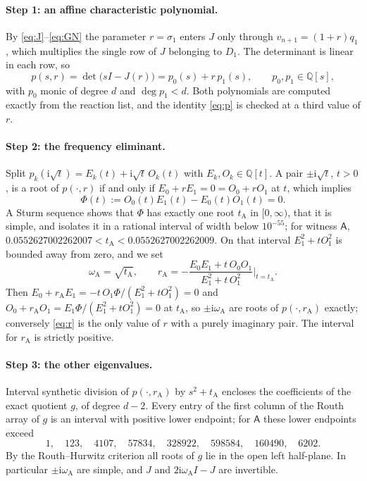 \documentclass[11pt,a4paper]{article}
\theoremstyle{plain}
\theoremstyle{definition}
\theoremstyle{remark}
\newcommand{\ii}{\mathrm i}
\newcommand{\rA}{r_{\mathrm A}}
\newcommand{\omA}{\omega_{\mathrm A}}
\newcommand{\WA}{\mathsf A}
\begin{document}
\paragraph{Step 1: an affine characteristic polynomial.} By \eqref{eq:J}--\eqref{eq:GN} the parameter $r=\sigma_1$ enters $J$ only through $v_{n+1}=(1+r)q_1$, which multiplies the single row of $J$ belonging to $D_1$. The determinant is linear in each row, so
\begin{equation}\label{eq:p}
 p(s,r)=\det\bigl(sI-J(r)\bigr)=p_0(s)+r\,p_1(s),\qquad p_0,p_1\in\mathbb Q[s],
\end{equation}
with $p_0$ monic of degree $d$ and $\deg p_1<d$. Both polynomials are computed exactly from the reaction list, and the identity \eqref{eq:p} is checked at a third value of $r$.

\paragraph{Step 2: the frequency eliminant.} Split $p_k(\ii\sqrt t)=E_k(t)+\ii\sqrt t\,O_k(t)$ with $E_k,O_k\in\mathbb Q[t]$. A pair $\pm\ii\sqrt t$, $t>0$, is a root of $p(\cdot,r)$ if and only if $E_0+rE_1=0=O_0+rO_1$ at $t$, which implies
\begin{equation}\label{eq:Phi}
 \Phi(t):=O_0(t)E_1(t)-E_0(t)O_1(t)=0 .
\end{equation}
A Sturm sequence shows that $\Phi$ has exactly one root $t_{\mathrm A}$ in $[0,\infty)$, that it is simple, and isolates it in a rational interval of width below $10^{-55}$; for witness $\WA$, $0.0552627002262007<t_{\mathrm A}<0.0552627002262009$. On that interval $E_1^2+tO_1^2$ is bounded away from zero, and we set
\begin{equation}\label{eq:r}
 \omA=\sqrt{t_{\mathrm A}},\qquad \rA=-\frac{E_0E_1+t\,O_0O_1}{E_1^2+t\,O_1^2}\Big|_{t=t_{\mathrm A}} .
\end{equation}
Then $E_0+\rA E_1=-t\,O_1\Phi/(E_1^2+tO_1^2)=0$ and $O_0+\rA O_1=E_1\Phi/(E_1^2+tO_1^2)=0$ at $t_{\mathrm A}$, so $\pm\ii\omA$ are roots of $p(\cdot,\rA)$ exactly; conversely \eqref{eq:r} is the only value of $r$ with a purely imaginary pair. The interval for $\rA$ is strictly positive.

\paragraph{Step 3: the other eigenvalues.} Interval synthetic division of $p(\cdot,\rA)$ by $s^2+t_{\mathrm A}$ encloses the coefficients of the exact quotient $g$, of degree $d-2$. Every entry of the first column of the Routh array of $g$ is an interval with positive lower endpoint; for $\WA$ these lower endpoints exceed
\[
 1,\quad 123,\quad 4107,\quad 57834,\quad 328922,\quad 598584,\quad 160490,\quad 6202 .
\]
By the Routh--Hurwitz criterion all roots of $g$ lie in the open left half-plane. In particular $\pm\ii\omA$ are simple, and $J$ and $2\ii\omA I-J$ are invertible.
\end{document}
